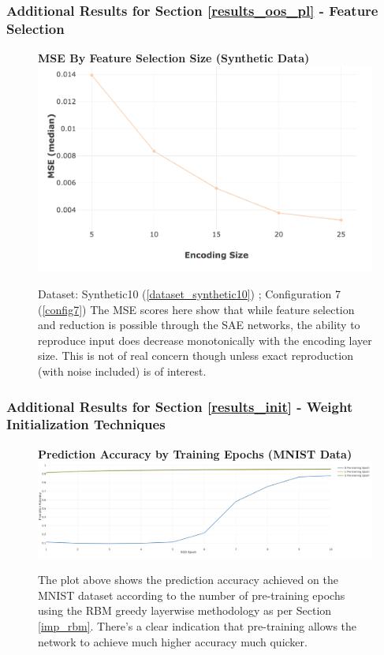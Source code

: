 \documentclass[a4paper,11pt,oneside]{article}
\theoremstyle{plain}
\theoremstyle{definition}
\begin{document}
	\subsubsection{Additional Results for Section \ref{results_oos_pl} - Feature Selection }\label{results_features_appendix}
	
	\begin{figure}[H]
		\centering 
		\textbf{MSE By Feature Selection Size (Synthetic Data)}
		\includegraphics[scale=0.3]{images/results/8_appendix/synth_sae_mse.png} 
		\caption[MSE By Feature Selection Size (Synthetic Data)]{Dataset: Synthetic10 (\ref{dataset_synthetic10}) ; Configuration 7 (\ref{config7})
			\newline The MSE scores here show that while feature selection and reduction is possible through the SAE networks, the ability to reproduce input does decrease monotonically with the encoding layer size. This is not of real concern though unless exact reproduction (with noise included) is of interest.}
		\label{figure-synth_sae_mse}
	\end{figure}
	
	\subsubsection{Additional Results for Section \ref{results_init} - Weight Initialization Techniques }\label{results_init_appendix}
	
	\begin{figure}[H]
		\centering 
		\textbf{Prediction Accuracy by Training Epochs (MNIST Data)} 
		\includegraphics[scale=0.2]{images/results/8_appendix/rbm_pretraining.png}
		\caption[Prediction Accuracy by Training Epochs (MNIST Data)]{The plot above shows the prediction accuracy achieved on the MNIST dataset according to the number of pre-training epochs using the RBM greedy layerwise methodology as per Section \ref{imp_rbm}. There's a clear indication that pre-training allows the network to achieve much higher accuracy much quicker.}
		\label{figure-rbm_pretraining}
	\end{figure}
	
\end{document}
